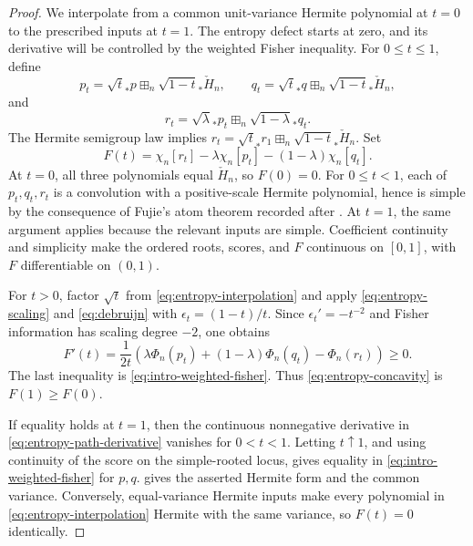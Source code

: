 \documentclass[12pt,reqno]{amsart}
\theoremstyle{definition}
\theoremstyle{remark}
\begin{document}
\begin{proof}
We interpolate from a common unit-variance Hermite polynomial at \(t=0\) to the prescribed inputs at \(t=1\). The entropy defect starts at zero, and its derivative will be controlled by the weighted Fisher inequality. For \(0\leq t\leq1\), define
\begin{equation}\label{eq:entropy-interpolation}
 p_t=\sqrt t_*p\boxplus_n\sqrt{1-t}_*\check H_n,
 \qquad
 q_t=\sqrt t_*q\boxplus_n\sqrt{1-t}_*\check H_n,
\end{equation}
and
\begin{equation}\label{eq:r-interpolation}
 r_t=\sqrt\lambda_*p_t\boxplus_n\sqrt{1-\lambda}_*q_t.
\end{equation}
The Hermite semigroup law implies
\(r_t=\sqrt t_*r_1\boxplus_n\sqrt{1-t}_*\check H_n\).  Set
\begin{equation}\label{eq:entropy-defect-path}
 F(t)=\chi_n[r_t]-\lambda\chi_n[p_t]-(1-\lambda)\chi_n[q_t].
\end{equation}
At \(t=0\), all three polynomials equal \(\check H_n\), so \(F(0)=0\).
For \(0\leq t<1\), each of \(p_t,q_t,r_t\) is a convolution with a
positive-scale Hermite polynomial, hence is simple by the consequence of
Fujie's atom theorem recorded after .  At
\(t=1\), the same argument applies because the relevant inputs are simple.
Coefficient continuity and simplicity make
the ordered roots, scores, and \(F\) continuous on \([0,1]\), with \(F\)
differentiable on \((0,1)\).

For \(t>0\), factor \(\sqrt t\) from \eqref{eq:entropy-interpolation} and
apply \eqref{eq:entropy-scaling} and \eqref{eq:debruijn} with
\(\epsilon_t=(1-t)/t\).  Since
\(\epsilon_t'=-t^{-2}\) and Fisher information has scaling degree \(-2\),
one obtains
\begin{equation}\label{eq:entropy-path-derivative}
 F'(t)=\frac{1}{2t}\left(
 \lambda\Phi_n(p_t)+(1-\lambda)\Phi_n(q_t)-\Phi_n(r_t)
 \right)\geq0.
\end{equation}
The last inequality is \eqref{eq:intro-weighted-fisher}.  Thus
\eqref{eq:entropy-concavity} is \(F(1)\geq F(0)\).

If equality holds at \(t=1\), then the continuous nonnegative derivative
in \eqref{eq:entropy-path-derivative} vanishes for \(0<t<1\).  Letting
\(t\uparrow1\), and using continuity of the score on the simple-rooted
locus, gives equality in \eqref{eq:intro-weighted-fisher} for \(p,q\).
 gives the asserted Hermite form and
the common variance.  Conversely, equal-variance Hermite inputs make every
polynomial in \eqref{eq:entropy-interpolation} Hermite with the same
variance, so \(F(t)=0\) identically.
\end{proof}
\end{document}
